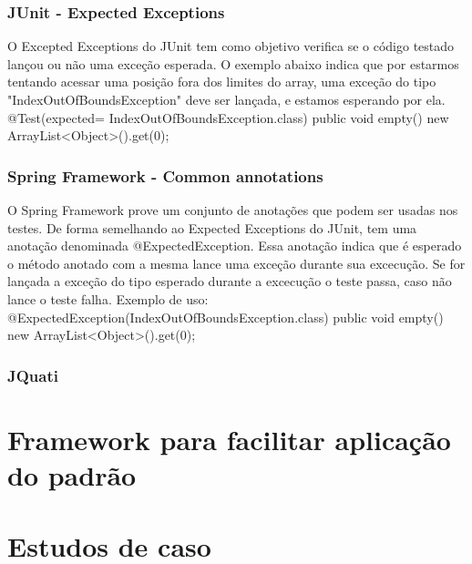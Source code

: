 \documentclass[12pt,a4paper,oneside]{book}
\begin{document}
\subsection{JUnit - Expected Exceptions}
O Excepted Exceptions do JUnit tem como objetivo verifica se o código testado lançou ou não uma exceção esperada.
O exemplo abaixo indica que por estarmos tentando acessar uma posição fora dos limites do array, uma exceção do tipo "IndexOutOfBoundsException" deve ser lançada, e estamos esperando por ela.
@Test(expected= IndexOutOfBoundsException.class) public void empty() { 
    new ArrayList<Object>().get(0); 
}

\subsection{Spring Framework - Common annotations}
O Spring Framework prove um conjunto de anotações que podem ser usadas nos testes. De forma semelhando ao Expected Exceptions do JUnit, tem uma anotação denominada @ExpectedException. 
Essa anotação indica que é esperado o método anotado com a mesma lance uma exceção durante sua excecução. Se for lançada a exceção do tipo esperado durante a excecução o teste passa, caso não lance o teste falha.
Exemplo de uso:
@ExpectedException(IndexOutOfBoundsException.class)
public void empty() {
   new ArrayList<Object>().get(0);
}

\subsection{JQuati}




\chapter{Framework para facilitar aplicação do padrão}

\chapter{Estudos de caso}
\end{document}
